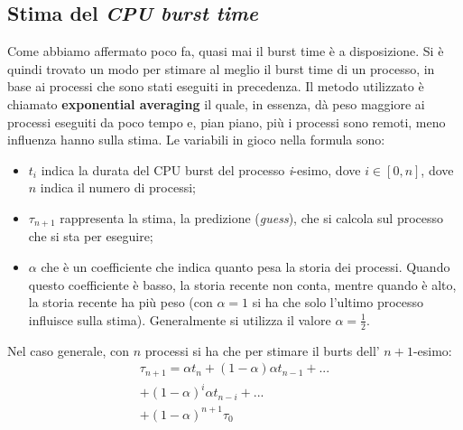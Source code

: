 \subsection{Stima del \textit{CPU burst time}}
Come abbiamo affermato poco fa, quasi mai il burst time è a disposizione. Si è quindi trovato un modo per stimare al meglio il burst time di un processo, in base ai processi che sono stati eseguiti in precedenza. Il metodo utilizzato è chiamato \textbf{exponential averaging} il quale, in essenza, dà peso maggiore ai processi eseguiti da poco tempo e, pian piano, più i processi sono remoti, meno influenza hanno sulla stima. Le variabili in gioco nella formula sono:
\vspace{-5px}
\begin{itemize}
\setlength{\itemsep}{-.15 em}
    \item $t_i$ indica la durata del CPU burst del processo \textit{i}-esimo, dove $i\in[0,n]$, dove $n$ indica il numero di processi;
    \item $\tau_{n+1}$ rappresenta la stima, la predizione (\textit{guess}), che si calcola sul processo che si sta per eseguire;
    \item $\alpha$ che è un coefficiente che indica quanto pesa la storia dei processi. Quando questo coefficiente è basso, la storia recente non conta, mentre quando è alto, la storia recente ha più peso (con $\alpha = 1$ si ha che solo l'ultimo processo influisce sulla stima). Generalmente si utilizza il valore $\alpha = \frac{1}{2}$.
\end{itemize}
Nel caso generale, con $n$ processi si ha che per stimare il burts dell' $n+1$-esimo:
\begin{gather*}
    \tau_{n + 1} = \alpha t_n + (1 - \alpha)\alpha t_{n - 1} + ... \\
                    + (1 - \alpha)^i\alpha t_{n - i} + ...\\
                    + (1 - \alpha)^{n + 1}\tau_0
\end{gather*}

